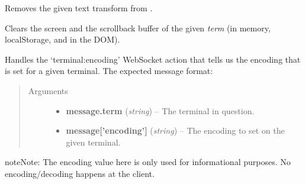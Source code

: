 \documentclass[letterpaper,10pt,openany]{sphinxmanual}
\begin{document}

\begin{fulllineitems}
\label{Applications/terminal/js_terminal:GateOne.Terminal.unregisterTextTransform}
Removes the given text transform from .

\end{fulllineitems}


\begin{fulllineitems}
\label{Applications/terminal/js_terminal:GateOne.Terminal.resetTerminalAction}
Clears the screen and the scrollback buffer of the given \emph{term} (in memory, localStorage, and in the DOM).

\end{fulllineitems}


\begin{fulllineitems}
\label{Applications/terminal/js_terminal:GateOne.Terminal.termEncodingAction}
Handles the `terminal:encoding' WebSocket action that tells us the encoding that is set for a given terminal.  The expected message format:
\begin{quote}\begin{description}
\item[{Arguments}] \leavevmode\begin{itemize}
\item {} 
\textbf{message.term} (\emph{string}) -- The terminal in question.

\item {} 
\textbf{message{[}'encoding'{]}} (\emph{string}) -- The encoding to set on the given terminal.

\end{itemize}

\end{description}\end{quote}

\begin{notice}{note}{Note:}
The encoding value here is only used for informational purposes.  No encoding/decoding happens at the client.
\end{notice}

\end{fulllineitems}
\end{document}
